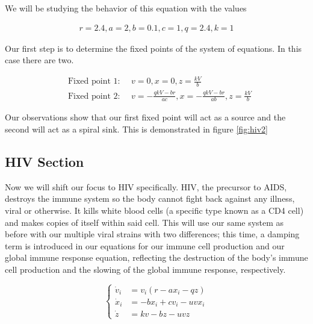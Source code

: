 \documentclass{article}
\begin{document}
We will be studying the behavior of this equation with the values

\begin{equation}
    \begin{split}
        r = 2.4, a = 2, b=0.1,c=1,q=2.4,k=1
    \end{split}
    \label{eq:vals}
\end{equation}

Our first step is to determine the fixed points of the system of equations. In this case there are two.

\begin{equation}
	\begin{split}
		&\text{Fixed point 1: } \quad v=0,x=0,z={\frac {kV}{b}} \\
		&\text{Fixed point 2: } \quad v=-{\frac {qkV-br}{ac}},x=-{\frac {qkV-br}{ab}},z={\frac {kV}{b}} 
	\end{split}
	\label{eq:fixed}
\end{equation}

Our observations show that our first fixed point will act as a source and the second will act as a spiral sink. This is demonstrated in figure \ref{fig:hiv2}


\subsection{HIV Section}

Now we will shift our focus to HIV specifically. HIV, the precursor to AIDS, destroys the immune system so the body cannot fight back against any illness, viral or otherwise. It kills white blood cells (a specific type known as a CD4 cell) and makes copies of itself within said cell. This will use our same system as before with our multiple viral strains with two differences; this time, a damping term is introduced in our equations for our immune cell production and our global immune response equation, reflecting the destruction of the body’s immune cell production and the slowing of the global immune response, respectively.

\begin{equation}
	\begin{cases}
		\dot v_i &= v_i (r-ax_i-qz)\\
		\dot x_i &= -bx_i + cv_i - uvx_i\\
		\dot z &= kv - bz - uvz
	\end{cases}
\end{equation}
\end{document}
